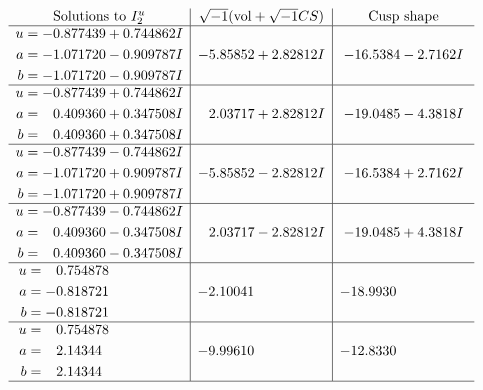 \documentclass[1p]{elsarticle_modified}
\theoremstyle{definition}
\newcommand{\I}{\sqrt{-1}}
\begin{document}
$$\begin{array}{c|c|c}  
\text{Solutions to }I^u_{2}& \I (\text{vol} + \sqrt{-1}CS) & \text{Cusp shape}\\
 \hline 
\begin{aligned}
u &= -0.877439 + 0.744862 I \\
a &= -1.071720 - 0.909787 I \\
b &= -1.071720 - 0.909787 I\end{aligned}
 & -5.85852 + 2.82812 I & -16.5384 - 2.7162 I \\ \hline\begin{aligned}
u &= -0.877439 + 0.744862 I \\
a &= \phantom{-}0.409360 + 0.347508 I \\
b &= \phantom{-}0.409360 + 0.347508 I\end{aligned}
 & \phantom{-}2.03717 + 2.82812 I & -19.0485 - 4.3818 I \\ \hline\begin{aligned}
u &= -0.877439 - 0.744862 I \\
a &= -1.071720 + 0.909787 I \\
b &= -1.071720 + 0.909787 I\end{aligned}
 & -5.85852 - 2.82812 I & -16.5384 + 2.7162 I \\ \hline\begin{aligned}
u &= -0.877439 - 0.744862 I \\
a &= \phantom{-}0.409360 - 0.347508 I \\
b &= \phantom{-}0.409360 - 0.347508 I\end{aligned}
 & \phantom{-}2.03717 - 2.82812 I & -19.0485 + 4.3818 I \\ \hline\begin{aligned}
u &= \phantom{-}0.754878\phantom{ +0.000000I} \\
a &= -0.818721\phantom{ +0.000000I} \\
b &= -0.818721\phantom{ +0.000000I}\end{aligned}
 & -2.10041\phantom{ +0.000000I} & -18.9930\phantom{ +0.000000I} \\ \hline\begin{aligned}
u &= \phantom{-}0.754878\phantom{ +0.000000I} \\
a &= \phantom{-}2.14344\phantom{ +0.000000I} \\
b &= \phantom{-}2.14344\phantom{ +0.000000I}\end{aligned}
 & -9.99610\phantom{ +0.000000I} & -12.8330\phantom{ +0.000000I}\\
 \hline 
 \end{array}$$\newpage
\end{document}
